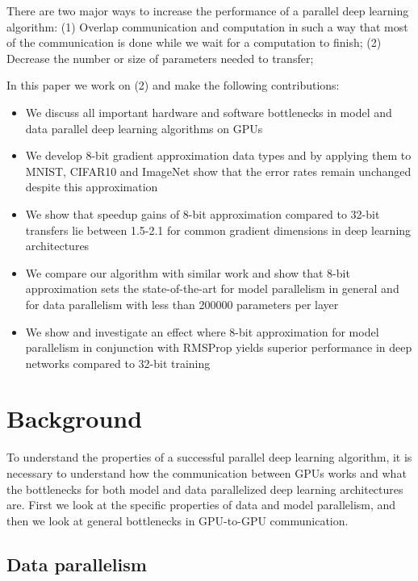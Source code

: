 \documentclass{article} %
\begin{document}
There are two major ways to increase the performance of a parallel deep learning algorithm: (1) Overlap communication and computation in such a way that most of the communication is done while we wait for a computation to finish; (2) Decrease the number or size of parameters needed to transfer;

In this paper we work on (2) and make the following contributions: 
\begin{itemize}
	\item We discuss all important hardware and software bottlenecks in model and data parallel deep learning algorithms on GPUs
	\item We develop 8-bit gradient approximation data types and by applying them to MNIST, CIFAR10 and ImageNet show that the error rates remain unchanged despite this approximation
	\item We show that speedup gains of 8-bit approximation compared to 32-bit transfers lie between 1.5-2.1 for common gradient dimensions in deep learning architectures
	\item We compare our algorithm with similar work and show that 8-bit approximation sets the state-of-the-art for model parallelism in general and for data parallelism with less than 200000 parameters per layer
	\item We show and investigate an effect where 8-bit approximation for model parallelism in conjunction with RMSProp yields superior performance in deep networks compared to 32-bit training
\end{itemize}
\section{Background}

 To understand the properties of a successful parallel deep learning algorithm, it is necessary to understand how the communication between GPUs works and what the bottlenecks for both model and data parallelized deep learning architectures are. First we look at the specific properties of data and model parallelism, and then we look at general bottlenecks in GPU-to-GPU communication.

\subsection{Data parallelism}
\end{document}
